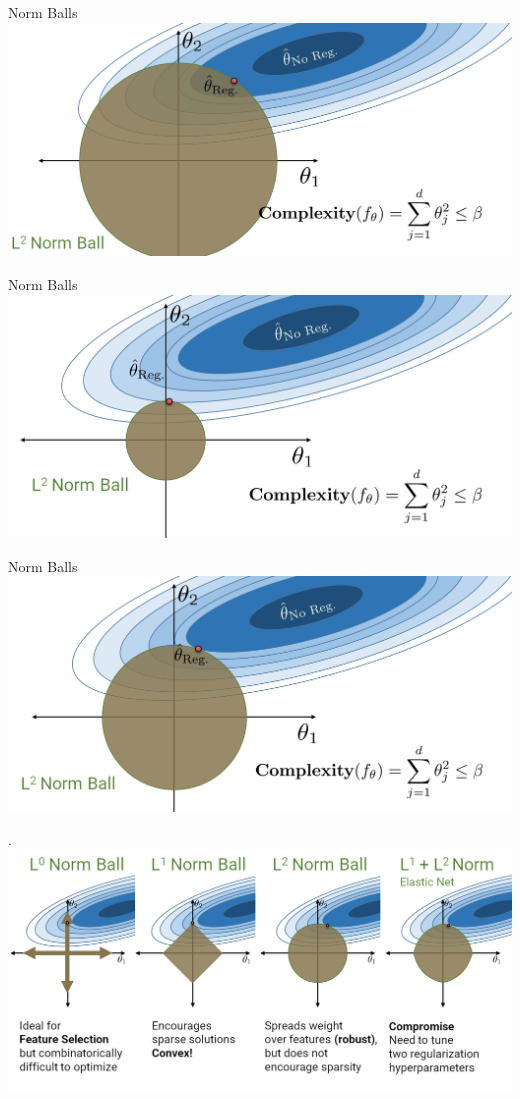 \documentclass[aspectratio=169]{../latex_main/tntbeamer}  %
\begin{document}
	
	\begin{frame}{Norm Balls}
	    \includegraphics[scale=.35]{Bild14}
	\end{frame}
	
	
	\begin{frame}{Norm Balls}
	    \includegraphics[scale=.35]{Bild15}
	\end{frame}
	
	
	\begin{frame}{Norm Balls}
	    \includegraphics[scale=.35]{Bild16}
	\end{frame}
	
	\begin{frame}{.}
	    \includegraphics[scale=.4]{Bild17}
	\end{frame}
	
\end{document}
